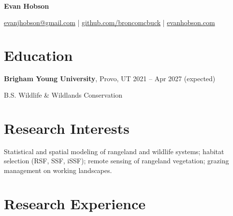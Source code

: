 \documentclass[11pt]{article}
\begin{document}
\begin{center}
{\Huge\bfseries Evan Hobson}

\vspace{0.25em}

\href{mailto:evanjhobson@gmail.com}{evanjhobson@gmail.com} \;|\;
\href{https://github.com/broncomcbuck}{github.com/broncomcbuck} \;|\;
\href{https://evanhobson.com}{evanhobson.com}
\end{center}

\vspace{0.2em}

\section*{Education}

\textbf{Brigham Young University}, Provo, UT \hfill 2021 -- Apr 2027 (expected)\par
B.S. Wildlife \& Wildlands Conservation

\section*{Research Interests}
Statistical and spatial modeling of rangeland and wildlife systems; habitat selection (RSF, SSF,
iSSF); remote sensing of rangeland vegetation; grazing management on working landscapes.

\section*{Research Experience}
\end{document}
